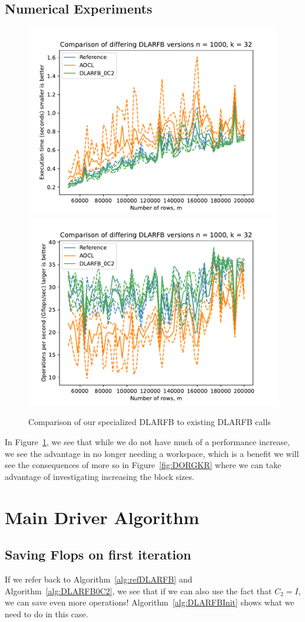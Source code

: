 \documentclass[12pt]{article}
\begin{document}
    \subsection{Numerical Experiments}
        \begin{figure}
            \centering
            \includegraphics[width=.45\textwidth]{figures/timeDLARFB.pdf}
            \includegraphics[width=.45\textwidth]{figures/flopDLARFB.pdf}
            \caption{Comparison of our specialized DLARFB to existing DLARFB calls}\label{fig:DLARFB}
        \end{figure}

        In Figure~\ref{fig:DLARFB}, we see that while we do not have much of a performance increase,
        we see the advantage in no longer needing a workspace, which is a benefit we will see the 
        consequences of more so in Figure~\ref{fig:DORGKR} where we can take advantage of investigating
        increasing the block sizes.
    \section{Main Driver Algorithm}
    \subsection{Saving Flops on first iteration}
    If we refer back to Algorithm~\ref{alg:refDLARFB} and Algorithm~\ref{alg:DLARFB0C2}, we see that if we can also
    use the fact that $C_2=I$, we can save even more operations! Algorithm~\ref{alg:DLARFBInit} shows what we 
    need to do in this case.
    
\end{document}
